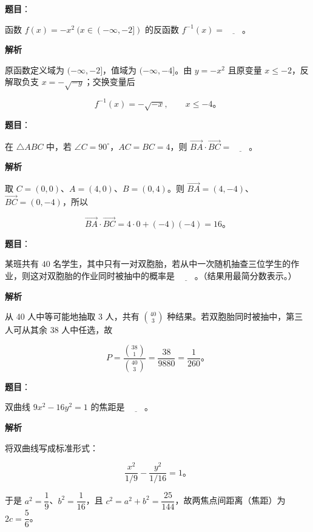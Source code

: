 \begin{answer}

\textbf{题目}：

函数 $f(x)=-x^2\ (x\in(-\infty,-2])$ 的反函数 $f^{-1}(x)=\underline{\qquad}$。

\textbf{解析}

原函数定义域为 $(-\infty,-2]$，值域为 $(-\infty,-4]$。由 $y=-x^2$ 且原变量 $x\le-2$，反解取负支 $x=-\sqrt{-y}$；交换变量后

\nopagebreak[4]
\[
f^{-1}(x)=-\sqrt{-x},\qquad x\le-4\text{。}
\]


\end{answer}
\begin{answer}

\textbf{题目}：

在 $\triangle ABC$ 中，若 $\angle C=90^\circ$，$AC=BC=4$，则 $\overrightarrow{BA}\cdot\overrightarrow{BC}=\underline{\qquad}$。

\textbf{解析}

取 $C=(0,0)$、$A=(4,0)$、$B=(0,4)$。则 $\overrightarrow{BA}=(4,-4)$、$\overrightarrow{BC}=(0,-4)$，所以

\nopagebreak[4]
\[
\overrightarrow{BA}\cdot\overrightarrow{BC}=4\cdot0+(-4)(-4)=16\text{。}
\]


\end{answer}
\begin{answer}

\textbf{题目}：

某班共有 $40$ 名学生，其中只有一对双胞胎，若从中一次随机抽查三位学生的作业，则这对双胞胎的作业同时被抽中的概率是 $\underline{\qquad}$。（结果用最简分数表示。）

\textbf{解析}

从 40 人中等可能地抽取 3 人，共有 $\binom{40}{3}$ 种结果。若双胞胎同时被抽中，第三人可从其余 38 人中任选，故

\nopagebreak[4]
\[
P=\frac{\binom{38}{1}}{\binom{40}{3}}=\frac{38}{9880}=\frac1{260}\text{。}
\]


\end{answer}
\begin{answer}

\textbf{题目}：

双曲线 $9x^2-16y^2=1$ 的焦距是 $\underline{\qquad}$。

\textbf{解析}

将双曲线写成标准形式：

\nopagebreak[4]
\[
\frac{x^2}{1/9}-\frac{y^2}{1/16}=1\text{。}
\]

于是 $a^2=\dfrac19$、$b^2=\dfrac1{16}$，且 $c^2=a^2+b^2=\dfrac{25}{144}$，故两焦点间距离（焦距）为 $2c=\dfrac56$。


\end{answer}
